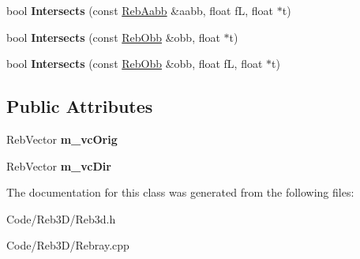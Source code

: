 \begin{DoxyCompactItemize}
\item 
bool {\bfseries Intersects} (const \hyperlink{class_reb_aabb}{Reb\+Aabb} \&aabb, float fL, float $\ast$t)\hypertarget{class_reb_ray_ae94b561a85bc41416165c71abbf8b2d6}{}\label{class_reb_ray_ae94b561a85bc41416165c71abbf8b2d6}

\item 
bool {\bfseries Intersects} (const \hyperlink{class_reb_obb}{Reb\+Obb} \&obb, float $\ast$t)\hypertarget{class_reb_ray_ab868db664b870ca0bf2e5cc81cad652a}{}\label{class_reb_ray_ab868db664b870ca0bf2e5cc81cad652a}

\item 
bool {\bfseries Intersects} (const \hyperlink{class_reb_obb}{Reb\+Obb} \&obb, float fL, float $\ast$t)\hypertarget{class_reb_ray_ab2295a6c98cd27b91d24786dde4faf30}{}\label{class_reb_ray_ab2295a6c98cd27b91d24786dde4faf30}

\end{DoxyCompactItemize}
\subsection*{Public Attributes}
\begin{DoxyCompactItemize}
\item 
Reb\+Vector {\bfseries m\+\_\+vc\+Orig}\hypertarget{class_reb_ray_a7adaafdd9b3ef83406ff4a86278642e8}{}\label{class_reb_ray_a7adaafdd9b3ef83406ff4a86278642e8}

\item 
Reb\+Vector {\bfseries m\+\_\+vc\+Dir}\hypertarget{class_reb_ray_a855ebe311fda8ed16c9b36d4ce96db6f}{}\label{class_reb_ray_a855ebe311fda8ed16c9b36d4ce96db6f}

\end{DoxyCompactItemize}


The documentation for this class was generated from the following files\+:\begin{DoxyCompactItemize}
\item 
Code/\+Reb3\+D/Reb3d.\+h\item 
Code/\+Reb3\+D/Rebray.\+cpp\end{DoxyCompactItemize}
